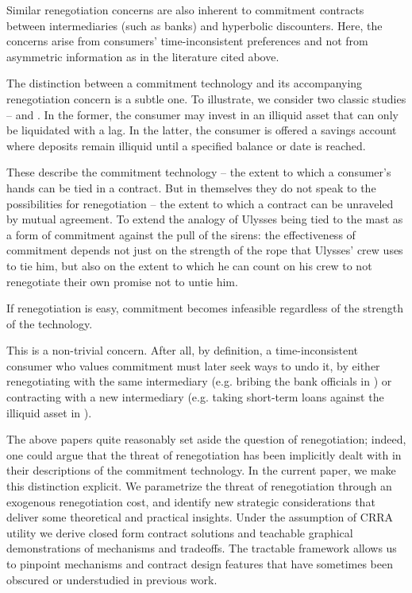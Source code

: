 \documentclass[11pt,english]{article}
\theoremstyle{plain}
\theoremstyle{definition}
\begin{document}
Similar renegotiation concerns are also inherent to commitment contracts between intermediaries (such as banks) and hyperbolic discounters. Here, the concerns arise from consumers' time-inconsistent preferences and not from asymmetric information as in the literature cited above. 

The distinction between a commitment technology and its accompanying renegotiation concern is a subtle one. To illustrate, we consider two classic studies --  \citet{laibson1997} and \citet{ashraf2006}. In the former, the consumer may invest in an illiquid asset that can only be liquidated with a lag. In the latter, the consumer is offered a savings account where deposits remain illiquid until a specified balance or date is reached.

These describe the commitment technology -- the extent to which a consumer's hands can be tied in a contract. But in themselves they do not speak to the possibilities for renegotiation -- the extent to which a contract can be unraveled by mutual agreement. To extend the \citet{ashraf2006} analogy of Ulysses being tied to the mast as a form of commitment against the pull of the sirens: the effectiveness of commitment depends not just on the strength of the rope that Ulysses' crew uses to tie him, but also on the extent to which he can count on his crew to not renegotiate their own promise not to untie him.

If renegotiation is easy, commitment becomes infeasible regardless of the strength of the technology.

This is a non-trivial concern. After all, by definition, a time-inconsistent consumer who values commitment must later seek ways to undo it, by either renegotiating with the same intermediary (e.g. bribing the bank officials in \citealp{ashraf2006}) or contracting with a new intermediary (e.g. taking short-term loans against the illiquid asset in \citealp{laibson1997}).


The above papers quite reasonably set aside the question of renegotiation; indeed, one could argue that the threat of renegotiation has been implicitly dealt with in their descriptions of the commitment technology. In the current paper, we make this distinction explicit. We parametrize the threat of renegotiation through an exogenous renegotiation cost, and identify new strategic considerations that deliver some theoretical and practical insights. Under the assumption of CRRA utility we derive closed form contract solutions and teachable graphical demonstrations of mechanisms and tradeoffs. The tractable framework allows us to pinpoint mechanisms and contract design features that have sometimes been obscured or understudied in previous work.
\end{document}
